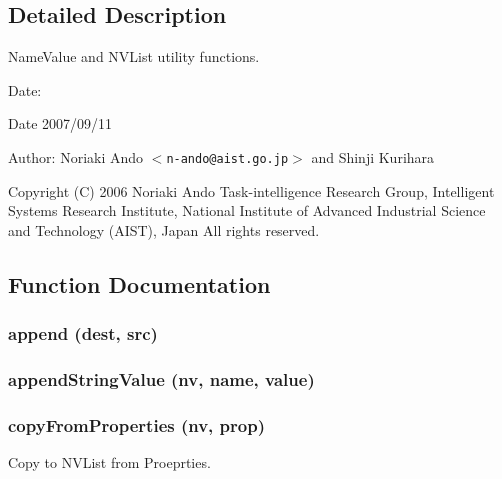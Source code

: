 \subsection{Detailed Description}
Name\-Value and NVList utility functions. 

\begin{Desc}
\item[Date:]\begin{Desc}
\item[Date]2007/09/11\end{Desc}
\end{Desc}
\begin{Desc}
\item[Author:]Noriaki Ando $<${\tt n-ando@aist.go.jp}$>$ and Shinji Kurihara\end{Desc}
Copyright (C) 2006 Noriaki Ando Task-intelligence Research Group, Intelligent Systems Research Institute, National Institute of Advanced Industrial Science and Technology (AIST), Japan All rights reserved.

\subsection{Function Documentation}
\subsubsection{\setlength{\rightskip}{0pt plus 5cm}append (dest, src)}\label{NVUtil_8py_a13}


\subsubsection{\setlength{\rightskip}{0pt plus 5cm}append\-String\-Value (nv, name, value)}\label{NVUtil_8py_a12}


\subsubsection{\setlength{\rightskip}{0pt plus 5cm}copy\-From\-Properties (nv, prop)}\label{NVUtil_8py_a4}


Copy to NVList from Proeprties. 

